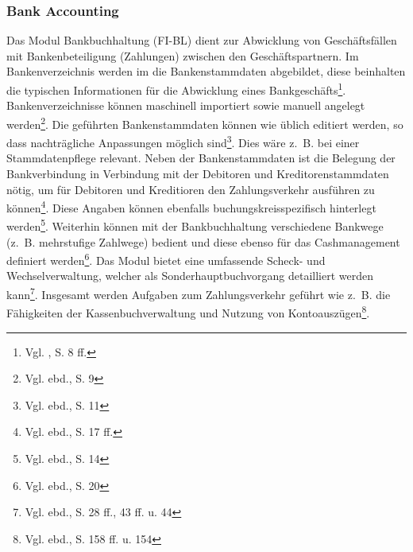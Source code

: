\subsubsection{Bank Accounting} 
Das Modul Bankbuchhaltung (FI-BL) dient zur Abwicklung von Geschäftsfällen mit Bankenbeteiligung (Zahlungen) zwischen den Geschäftspartnern. 
Im Bankenverzeichnis werden im die Bankenstammdaten abgebildet, diese beinhalten die typischen Informationen für die Abwicklung eines Bankgeschäfts\footnote{Vgl. \cite{SAPFIBL2001}, S. 8 ff.}. Bankenverzeichnisse können maschinell importiert sowie manuell angelegt werden\footnote{Vgl. ebd., S. 9}. Die geführten Bankenstammdaten können wie üblich editiert werden, so dass nachträgliche Anpassungen möglich sind\footnote{Vgl. ebd., S. 11}. Dies wäre z.~B. bei einer Stammdatenpflege relevant. Neben der Bankenstammdaten ist die Belegung der Bankverbindung in Verbindung mit der Debitoren und Kreditorenstammdaten nötig, um für Debitoren und Kreditioren den Zahlungsverkehr ausführen zu können\footnote{Vgl. ebd., S. 17 ff.}. Diese Angaben können ebenfalls buchungskreisspezifisch hinterlegt werden\footnote{Vgl. ebd., S. 14}. 
Weiterhin können mit der Bankbuchhaltung verschiedene Bankwege (z.~B. mehrstufige Zahlwege) bedient und diese ebenso für das Cashmanagement definiert werden\footnote{Vgl. ebd., S. 20}. Das Modul bietet eine umfassende Scheck- und Wechselverwaltung, welcher als Sonderhauptbuchvorgang detailliert werden kann\footnote{Vgl. ebd., S. 28 ff., 43 ff. u. 44}. Insgesamt werden Aufgaben zum Zahlungsverkehr geführt wie z.~B. die Fähigkeiten der Kassenbuchverwaltung und  Nutzung von Kontoauszügen\footnote{Vgl. ebd., S. 158 ff. u. 154}.

